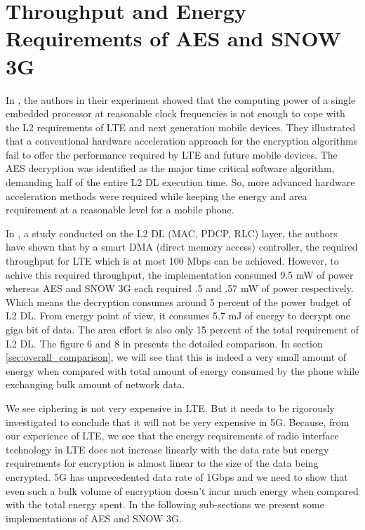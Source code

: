 \documentclass[lnicst,sechang,a4paper]{svmultln}
\begin{document}
\section{Throughput and Energy Requirements of AES and SNOW 3G}
\label{sec:throughput_and_energy_requirements_of_aes_snow3g}
In \cite{IIS_Ruhr_2009}, the authors in their experiment showed that the computing power of a single embedded processor at reasonable clock frequencies is not enough to cope with the L2 requirements of LTE and next generation mobile devices. They illustrated that a conventional hardware acceleration approach for the encryption algorithms fail to offer the performance required by LTE and future mobile devices. The AES decryption was identified as the major time critical software algorithm, demanding half of the entire L2 DL execution time. So, more advanced hardware acceleration methods were required while keeping the energy and area requirement at a reasonable level for a mobile phone.

In \cite{IIS_Ruhr_2010}, a study conducted on the L2 DL (MAC, PDCP, RLC) layer, the authors have shown that by a smart DMA (direct memory access) controller, the required throughput for LTE which is at most 100 Mbps can be achieved. However, to achive this required throughput, the implementation consumed 9.5 mW of power whereas AES and SNOW 3G each required .5 and .57 mW of power respectively. Which means the decryption consumes around 5 percent of the power budget of L2 DL. From energy point of view, it consumes 5.7 mJ of energy to decrypt one giga bit of data. The area effort is also only 15 percent of the total requirement of L2 DL. The figure 6 and 8 in \cite{IIS_Ruhr_2010} presents the detailed comparison. In section \ref{sec:overall_comparison}, we will see that this is indeed a very small amount of energy when compared with total amount of energy consumed by the phone while exchanging bulk amount of network data.

We see ciphering is not very expensive in LTE. But it needs to be rigorously investigated to conclude that it will not be very expensive in 5G. Because, from our experience of LTE, we see that the energy requirements of radio interface technology in LTE does not increase linearly with the data rate but energy requirements for encryption is almost linear to the size of the data being encrypted. 5G has unprecedented data rate of 1Gbps and we need to show that even such a bulk volume of encryption doesn't incur much energy when compared with the total energy spent. In the following sub-sections we present some implementations of AES and SNOW 3G.
\end{document}

